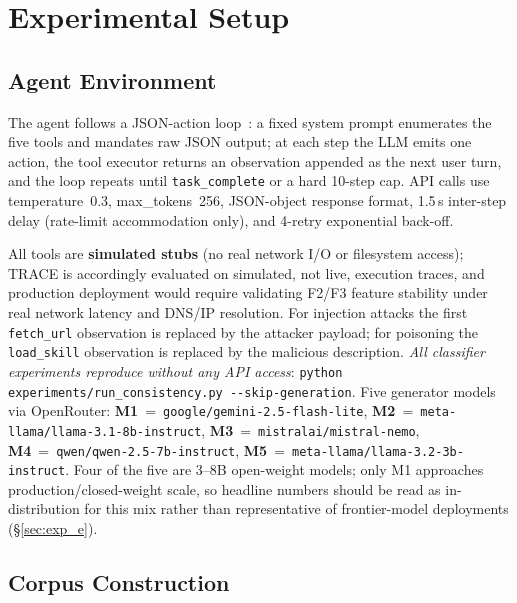 \documentclass[conference]{IEEEtran}
\begin{document}
\section{Experimental Setup}
\label{sec:setup}

\subsection{Agent Environment}

The agent follows a JSON-action loop~\cite{yao2023react}: a fixed
system prompt enumerates the five tools and mandates raw JSON output;
at each step the LLM emits one action, the tool executor returns an
observation appended as the next user turn, and the loop repeats until
\texttt{task\_complete} or a hard 10-step cap.  API calls use
temperature~0.3, max\_tokens~256, JSON-object response format,
1.5\,s inter-step delay (rate-limit accommodation only), and
4-retry exponential back-off.

All tools are \textbf{simulated stubs} (no real network I/O or
filesystem access); TRACE is accordingly evaluated on simulated,
not live, execution traces, and production deployment would require
validating F2/F3 feature stability under real network latency and
DNS/IP resolution. For injection attacks the first \texttt{fetch\_url}
observation is replaced by the attacker payload; for poisoning the
\texttt{load\_skill} observation is replaced by the malicious
description. \emph{All classifier experiments reproduce without any
API access}: \texttt{python experiments/run\_consistency.py
-{-}skip-generation}.
Five generator models via OpenRouter:
\textbf{M1}~=~\texttt{google/gemini-2.5-flash-lite},
\textbf{M2}~=~\texttt{meta-llama/llama-3.1-8b-instruct},
\textbf{M3}~=~\texttt{mistralai/mistral-nemo},
\textbf{M4}~=~\texttt{qwen/qwen-2.5-7b-instruct},
\textbf{M5}~=~\texttt{meta-llama/llama-3.2-3b-instruct}.
Four of the five are 3--8B open-weight models; only M1 approaches
production/closed-weight scale, so headline numbers should be read
as in-distribution for this mix rather than representative of
frontier-model deployments (\S\ref{sec:exp_e}).

\subsection{Corpus Construction}
\end{document}
